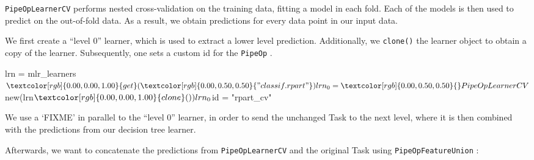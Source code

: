 \documentclass[
  11pt,
  parskip=half,
  DIV=calc,
  BCOR=10mm,
  x11names]{scrbook}
\newenvironment{Shaded}{}{}
\newcommand{\DecValTok}[1]{#1}
\newcommand{\KeywordTok}[1]{\textcolor[rgb]{0.00,0.00,1.00}{#1}}
\newcommand{\NormalTok}[1]{#1}
\newcommand{\OperatorTok}[1]{#1}
\newcommand{\StringTok}[1]{\textcolor[rgb]{0.00,0.50,0.50}{#1}}
\begin{document}
\texttt{PipeOpLearnerCV} performs nested cross-validation on the training data, fitting a model in each fold.
Each of the models is then used to predict on the out-of-fold data.
As a result, we obtain predictions for every data point in our input data.

We first create a ``level 0'' learner, which is used to extract a lower level prediction.
Additionally, we \texttt{clone()} the learner object to obtain a copy of the learner.
Subsequently, one sets a custom id for the \texttt{PipeOp} .

\begin{Shaded}
\begin{Highlighting}[]
\NormalTok{lrn =}\StringTok{ }\NormalTok{mlr_learners}\OperatorTok{$}\KeywordTok{get}\NormalTok{(}\StringTok{"classif.rpart"}\NormalTok{)}
\NormalTok{lrn_}\DecValTok{0}\NormalTok{ =}\StringTok{ }\NormalTok{PipeOpLearnerCV}\OperatorTok{$}\KeywordTok{new}\NormalTok{(lrn}\OperatorTok{$}\KeywordTok{clone}\NormalTok{())}
\NormalTok{lrn_}\DecValTok{0}\OperatorTok{$}\NormalTok{id =}\StringTok{ "rpart_cv"}
\end{Highlighting}
\end{Shaded}

We use a `FIXME' in parallel to the ``level 0'' learner, in order to send the unchanged Task to the next level, where it is then combined with the predictions from our decision tree learner.

\begin{Shaded}
\end{Shaded}

Afterwards, we want to concatenate the predictions from \texttt{PipeOpLearnerCV} and the original Task using \texttt{PipeOpFeatureUnion} :

\begin{Shaded}
\end{Shaded}
\end{document}
